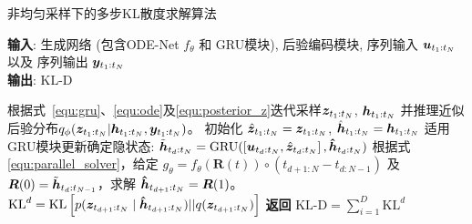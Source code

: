 \begin{algorithm}[tb]
\caption{非均匀采样下的多步KL散度求解算法}
\label{alg:parallel_overshooting}
\textbf{输入}: 生成网络 (包含ODE-Net $f_\theta$ 和 GRU模块), 后验编码模块, 序列输入 $\boldsymbol u_{t_1:t_N}$ 以及 序列输出 $\boldsymbol y_{t_1:t_N}$\\
\textbf{输出}: $\text{KL-D}$ 
\begin{algorithmic}[1] %
\State 根据式~\eqref{equ:gru}、\eqref{equ:ode}及\eqref{equ:posterior_z}迭代采样$\boldsymbol{z}_{t_1:t_N}$, $\boldsymbol{{h}}_{t_1:t_N}$ 并推理近似后验分布$q_{\phi}(\boldsymbol z_{t_1:t_N}|\boldsymbol h_{t_1:t_N}, \boldsymbol y_{t_1:t_N})$。
\State 初始化 $\hat{\boldsymbol{z}}_{t_1:t_N}=\boldsymbol{z}_{t_1:t_N}$, $\hat{\boldsymbol{h}}_{t_1:t_N}=\boldsymbol{h}_{t_1:t_N}$
\State 适用GRU模块更新确定隐状态: 
$\tilde{\boldsymbol{h}}_{t_d:t_N}=\text{GRU}(\left [\boldsymbol{u}_{t_d:t_N}, \hat{\boldsymbol{z}}_{t_d:t_N}\right], \boldsymbol{{\hat h}}_{t_d:t_N})$
\State 根据式\eqref{equ:parallel_solver}，给定 $g_{\theta}=f_{\theta}(\boldsymbol{R}(t)) \circ\left(t_{d+1:N}-t_{d:N-1}\right)$ 及 $\boldsymbol{R}(0)=\tilde{\boldsymbol{h}}_{t_d:t_{N-1}}$，求解 $\boldsymbol{{\hat h}}_{t_{d+1}:t_{N}}=\boldsymbol{R}(1)$。
\State $\text{KL}^d= \text{KL}\left[p(\boldsymbol{z}_{t_{d+1}:t_{N}}\mid \boldsymbol{{\hat h}}_{t_{d+1}:t_{N}})||q(\boldsymbol{z}_{t_{d+1}:t_N})\right]$
\EndFor
\State \textbf{返回} $\text{KL-D} = \sum_{i=1}^{D}\text{KL}^d$ 
\end{algorithmic}
\end{algorithm}

